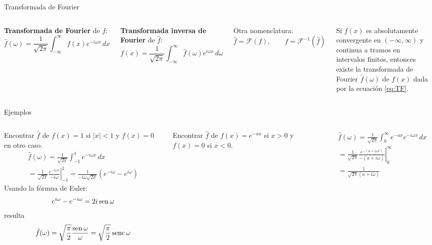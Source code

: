 \documentclass[9pt, aspectratio=169]{beamer}
\begin{document}
\begin{frame}{Transformada de Fourier}
\begin{columns}[c]
\textbf{Transformada de Fourier} de $f$:
\begin{equation}\label{eq:TF}
    \hat{f}(\omega) = \frac{1}{\sqrt{2 \pi}} \int_{-\infty}^{\infty} f(x) e^{-i \omega x} \, dx
\end{equation}

\textbf{Transformada inversa de Fourier} de $\hat{f}$:
\begin{equation}\label{eq:TIF}
f(x) = \frac{1}{\sqrt{2 \pi}} \int_{-\infty}^{\infty} \hat{f}(\omega) e^{i \omega x} \, d\omega
\end{equation}

Otra nomenclatura:
\[ \hat{f} = \mathscr{F}(f), \qquad f = \mathscr{F}^{-1}(\hat{f}) \]

\begin{theorem}
    Si $f(x)$ es absolutamente convergente en $(-\infty, \infty)$ y continua a tramos en intervalos finitos, entonces existe la transformada de Fourier $\hat{f}(\omega)$ de $f(x)$ dada por la ecuación \eqref{eq:TF}.
\end{theorem}
\end{columns}
\end{frame}

\begin{frame}{Ejemplos}
\begin{columns}[t]
\cx
Encontrar $\hat{f}$ de $f(x) = 1$ si $|x| < 1$ y $f(x) = 0$ en otro caso.
\begin{multline*}
    \hat{f}(\omega) = \frac{1}{\sqrt{2 \pi}} \int_{-1}^{1} e^{-i \omega x} \, dx \\
    = \frac{1}{\sqrt{2 \pi}} \left. \frac{e^{-i \omega x}}{-i \omega} \right|_{-1}^{1} = \frac{1}{-i \omega \sqrt{2 \pi} } \left( e^{-i \omega} - e^{i \omega} \right)
\end{multline*}
Usando la fórmua de Euler:
\[ e^{i \omega}- e^{-i \omega} = 2 i \operatorname{sen} \omega \]
resulta
\[ \hat{f}(\omega) = \sqrt{\frac{\pi}{2}} \frac{\operatorname{sen} \omega}{\omega} = \sqrt{\frac{\pi}{2}} \operatorname{senc}{\omega} \]
\pause

\cx
Encontrar $\hat{f}$ de $f(x) = e^{-a x}$ si $x > 0$ y $f(x) = 0$ si $x < 0$.

\begin{multline*}
    \hat{f}(\omega) = \frac{1}{\sqrt{2 \pi}} \int_{0}^{\infty} e^{-a x} e^{-i \omega x} \, dx \\
    = \frac{1}{\sqrt{2 \pi}} \left. \frac{e^{-(a + i \omega x)}}{-(a + i \omega)} \right|_{0}^{\infty}  \\ 
        = \frac{1}{\sqrt{2 \pi} (a + i \omega) } 
\end{multline*}
\end{columns}
\end{frame}
\end{document}
